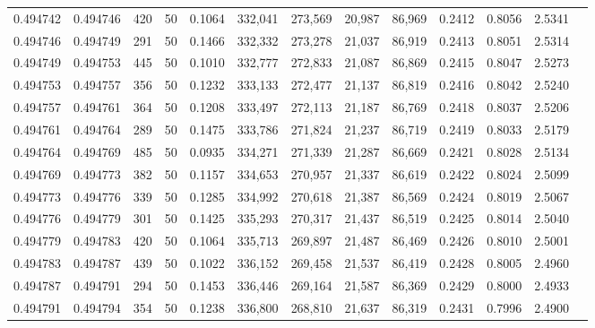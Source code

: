 \begin{tabular}{rrrrrrrrrrrrr}
0.494742 & 0.494746 &   420 &  50 &                                     0.1064 & 332,041 & 273,569 &  20,987 &  86,969 & 0.2412 & 0.8056 & 2.5341 \\
0.494746 & 0.494749 &   291 &  50 &                                     0.1466 & 332,332 & 273,278 &  21,037 &  86,919 & 0.2413 & 0.8051 & 2.5314 \\
0.494749 & 0.494753 &   445 &  50 &                                     0.1010 & 332,777 & 272,833 &  21,087 &  86,869 & 0.2415 & 0.8047 & 2.5273 \\
0.494753 & 0.494757 &   356 &  50 &                                     0.1232 & 333,133 & 272,477 &  21,137 &  86,819 & 0.2416 & 0.8042 & 2.5240 \\
0.494757 & 0.494761 &   364 &  50 &                                     0.1208 & 333,497 & 272,113 &  21,187 &  86,769 & 0.2418 & 0.8037 & 2.5206 \\
0.494761 & 0.494764 &   289 &  50 &                                     0.1475 & 333,786 & 271,824 &  21,237 &  86,719 & 0.2419 & 0.8033 & 2.5179 \\
0.494764 & 0.494769 &   485 &  50 &                                     0.0935 & 334,271 & 271,339 &  21,287 &  86,669 & 0.2421 & 0.8028 & 2.5134 \\
0.494769 & 0.494773 &   382 &  50 &                                     0.1157 & 334,653 & 270,957 &  21,337 &  86,619 & 0.2422 & 0.8024 & 2.5099 \\
0.494773 & 0.494776 &   339 &  50 &                                     0.1285 & 334,992 & 270,618 &  21,387 &  86,569 & 0.2424 & 0.8019 & 2.5067 \\
0.494776 & 0.494779 &   301 &  50 &                                     0.1425 & 335,293 & 270,317 &  21,437 &  86,519 & 0.2425 & 0.8014 & 2.5040 \\
0.494779 & 0.494783 &   420 &  50 &                                     0.1064 & 335,713 & 269,897 &  21,487 &  86,469 & 0.2426 & 0.8010 & 2.5001 \\
0.494783 & 0.494787 &   439 &  50 &                                     0.1022 & 336,152 & 269,458 &  21,537 &  86,419 & 0.2428 & 0.8005 & 2.4960 \\
0.494787 & 0.494791 &   294 &  50 &                                     0.1453 & 336,446 & 269,164 &  21,587 &  86,369 & 0.2429 & 0.8000 & 2.4933 \\
0.494791 & 0.494794 &   354 &  50 &                                     0.1238 & 336,800 & 268,810 &  21,637 &  86,319 & 0.2431 & 0.7996 & 2.4900 \\

\end{tabular}
